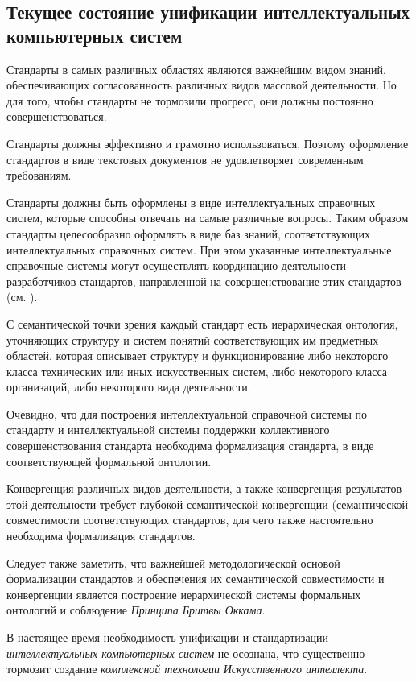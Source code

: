 \subsection{Текущее состояние унификации интеллектуальных компьютерных систем}
\label{subsec_current_state_unification_ICS}
Стандарты в самых различных областях являются важнейшим видом знаний, обеспечивающих согласованность различных видов массовой деятельности. Но для того, чтобы стандарты не тормозили прогресс, они должны постоянно совершенствоваться.

Стандарты должны эффективно и грамотно использоваться. Поэтому оформление стандартов в виде текстовых документов не удовлетворяет современным требованиям.

Стандарты должны быть оформлены в виде интеллектуальных справочных систем, которые способны отвечать на самые различные вопросы. Таким образом стандарты целесообразно оформлять в виде баз знаний, соответствующих интеллектуальных справочных систем. При этом указанные интеллектуальные справочные системы могут осуществлять координацию деятельности разработчиков стандартов, направленной на совершенствование этих стандартов (см. ).

С семантической точки зрения каждый стандарт есть иерархическая онтология, уточняющих структуру и систем понятий соответствующих им предметных областей, которая описывает структуру и функционирование либо некоторого класса технических или иных искусственных систем, либо некоторого класса организаций, либо некоторого вида деятельности.

Очевидно, что для построения интеллектуальной справочной системы по стандарту и интеллектуальной системы поддержки коллективного совершенствования стандарта необходима формализация стандарта, в виде соответствующей формальной онтологии.

Конвергенция различных видов деятельности, а также конвергенция результатов этой деятельности требует глубокой семантической конвергенции (семантической совместимости соответствующих стандартов, для чего также настоятельно необходима формализация стандартов.

Следует также заметить, что важнейшей методологической основой формализации стандартов и обеспечения их семантической совместимости и конвергенции является построение иерархической системы формальных онтологий и соблюдение \textit{Принципа Бритвы Оккама}.

В настоящее время необходимость унификации и стандартизации \textit{интеллектуальных компьютерных систем} не осознана, что существенно тормозит создание \textit{комплексной технологии} \textit{Искусственного интеллекта}.

